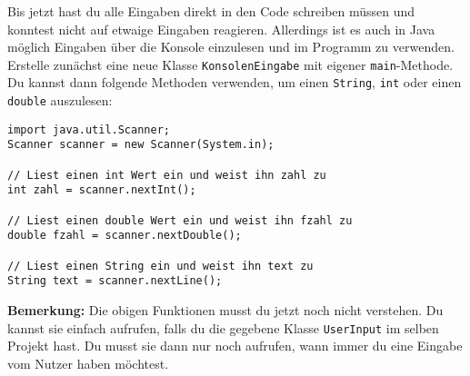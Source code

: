 \begin{questions}
Bis jetzt hast du alle Eingaben direkt in den Code schreiben müssen und konntest nicht auf etwaige Eingaben reagieren. Allerdings ist es auch in Java m\"oglich Eingaben \"uber die Konsole einzulesen und im Programm zu verwenden.\\
Erstelle zunächst eine neue Klasse \texttt{KonsolenEingabe} mit eigener \texttt{main}-Methode.\\
Du kannst dann folgende Methoden verwenden, um einen \texttt{String}, \texttt{int} oder einen \texttt{double} auszulesen:

\begin{lstlisting}
import java.util.Scanner;
Scanner scanner = new Scanner(System.in);

// Liest einen int Wert ein und weist ihn zahl zu
int zahl = scanner.nextInt();

// Liest einen double Wert ein und weist ihn fzahl zu
double fzahl = scanner.nextDouble();

// Liest einen String ein und weist ihn text zu
String text = scanner.nextLine();
\end{lstlisting}

\textbf{Bemerkung:} Die obigen Funktionen musst du jetzt noch nicht verstehen. Du kannst sie einfach aufrufen, falls du die gegebene Klasse \texttt{UserInput} im selben Projekt hast. Du musst sie dann nur noch aufrufen, wann immer du eine Eingabe vom Nutzer haben möchtest.



\end{questions}
